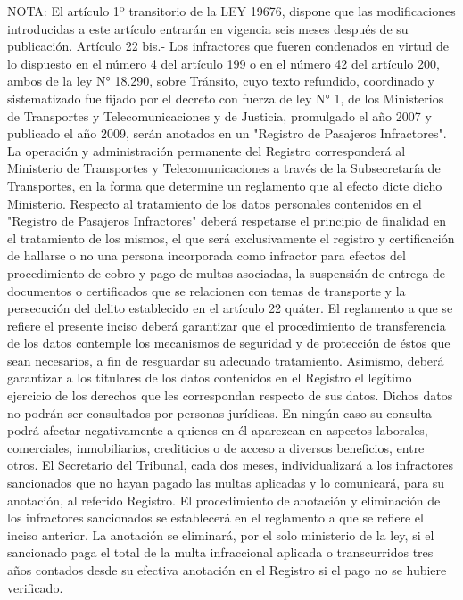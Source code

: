 NOTA:
    El artículo 1º transitorio de la LEY 19676, dispone que las modificaciones introducidas a este artículo entrarán en vigencia seis meses después de su publicación.
    Artículo 22 bis.- Los infractores que fueren condenados en virtud de lo dispuesto en el número 4 del artículo 199 o en el número 42 del artículo 200, ambos de la ley N° 18.290, sobre Tránsito, cuyo texto refundido, coordinado y sistematizado fue fijado por el decreto con fuerza de ley N° 1, de los Ministerios de Transportes y Telecomunicaciones y de Justicia, promulgado el año 2007 y publicado el año 2009, serán anotados en un "Registro de Pasajeros Infractores".
    La operación y administración permanente del Registro corresponderá al Ministerio de Transportes y Telecomunicaciones a través de la Subsecretaría de Transportes, en la forma que determine un reglamento que al efecto dicte dicho Ministerio. Respecto al tratamiento de los datos personales contenidos en el "Registro de Pasajeros Infractores" deberá respetarse el principio de finalidad en el tratamiento de los mismos, el que será exclusivamente el registro y certificación de hallarse o no una persona incorporada como infractor para efectos del procedimiento de cobro y pago de multas asociadas, la suspensión de entrega de documentos o certificados que se relacionen con temas de transporte y la persecución del delito establecido en el artículo 22 quáter. El reglamento a que se refiere el presente inciso deberá garantizar que el procedimiento de transferencia de los datos contemple los mecanismos de seguridad y de protección de éstos que sean necesarios, a fin de resguardar su adecuado tratamiento. Asimismo, deberá garantizar a los titulares de los datos contenidos en el Registro el legítimo ejercicio de los derechos que les correspondan respecto de sus datos. Dichos datos no podrán ser consultados por personas jurídicas. En ningún caso su consulta podrá afectar negativamente a quienes en él aparezcan en aspectos laborales, comerciales, inmobiliarios, crediticios o de acceso a diversos beneficios, entre otros.
    El Secretario del Tribunal, cada dos meses, individualizará a los infractores sancionados que no hayan pagado las multas aplicadas y lo comunicará, para su anotación, al referido Registro. El procedimiento de anotación y eliminación de los infractores sancionados se establecerá en el reglamento a que se refiere el inciso anterior. La anotación se eliminará, por el solo ministerio de la ley, si el sancionado paga el total de la multa infraccional aplicada o transcurridos tres años contados desde su efectiva anotación en el Registro si el pago no se hubiere verificado.
